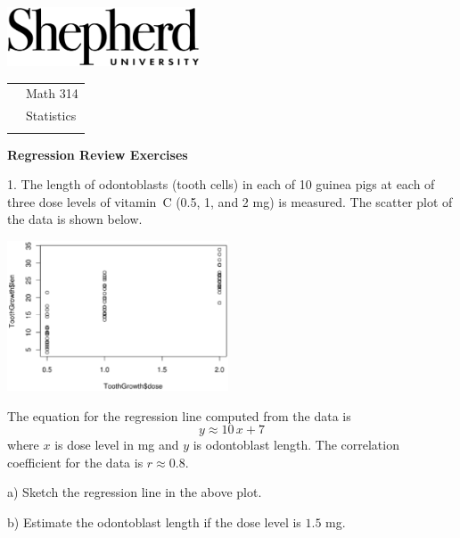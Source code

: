 \documentclass[10pt]{article}
\begin{document}
\pagestyle{empty}
\lstset{language=R, showspaces=false, showstringspaces=false}

\href{http://www.shepherd.edu}{\includegraphics[height=1.75cm]{logo-high-res.eps}}
\vspace{-1.69cm}

{\small
\begin{tabular}{cl}
& Math 314\\
& Statistics\\
\hspace{5.28in} & %
\end{tabular}
}
\setlength{\baselineskip}{1.05\baselineskip}

\begin{center}
\textbf{\large  Regression Review Exercises}
\end{center}
\medskip

1. The length of odontoblasts (tooth cells) in each of 10 guinea pigs 
at each of three dose levels of vitamin~C (0.5, 1, and 2 mg) 
is measured.  The scatter plot of the data is shown below.

\begin{center}
\includegraphics[height=1.75in,bb=0 22 515 340, clip]{teeth.eps}
\end{center}
The equation for the regression line computed from the data is 
\[y \approx 10\,x + 7\]
where $x$ is dose level in mg and $y$ is odontoblast length.
The correlation coefficient for the data is $r\approx 0.8$.

\hspace{20pt} a) Sketch the regression line in the above plot.
\medskip

\hspace{20pt} b) Estimate the odontoblast length if the dose level is $1.5$ mg.
\vspace{1.4in}
\end{document}
